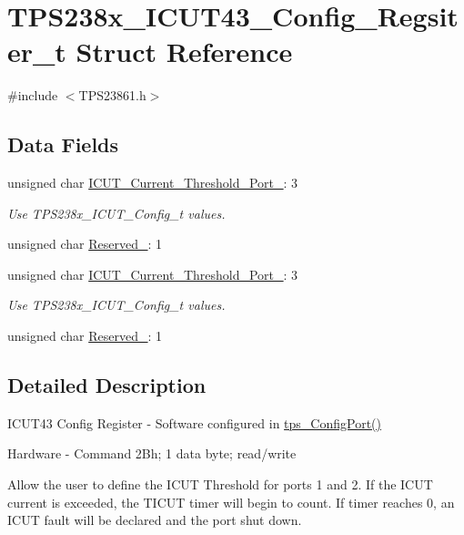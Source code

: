 \hypertarget{struct_t_p_s238x___i_c_u_t43___config___regsiter__t}{\section{T\-P\-S238x\-\_\-\-I\-C\-U\-T43\-\_\-\-Config\-\_\-\-Regsiter\-\_\-t Struct Reference}
\label{struct_t_p_s238x___i_c_u_t43___config___regsiter__t}
}


{\ttfamily \#include $<$T\-P\-S23861.\-h$>$}

\subsection*{Data Fields}
\begin{DoxyCompactItemize}
\item 
unsigned char \hyperlink{struct_t_p_s238x___i_c_u_t43___config___regsiter__t_a672725ddbaddd20636f4d1a3e1d3031c}{I\-C\-U\-T\-\_\-\-Current\-\_\-\-Threshold\-\_\-\-Port\-\_}\-: 3
\begin{DoxyCompactList}\small\item\em Use T\-P\-S238x\-\_\-\-I\-C\-U\-T\-\_\-\-Config\-\_\-t values. \end{DoxyCompactList}\item 
unsigned char \hyperlink{struct_t_p_s238x___i_c_u_t43___config___regsiter__t_a26925269078b96cfc7e9c91fcecaf905}{Reserved\-\_}\-: 1
\item 
unsigned char \hyperlink{struct_t_p_s238x___i_c_u_t43___config___regsiter__t_a3112afa8878fd6cc891279d37b6038af}{I\-C\-U\-T\-\_\-\-Current\-\_\-\-Threshold\-\_\-\-Port\-\_}\-: 3
\begin{DoxyCompactList}\small\item\em Use T\-P\-S238x\-\_\-\-I\-C\-U\-T\-\_\-\-Config\-\_\-t values. \end{DoxyCompactList}\item 
unsigned char \hyperlink{struct_t_p_s238x___i_c_u_t43___config___regsiter__t_a45c08501c716490c794d6f3a2cfc2d16}{Reserved\-\_}\-: 1
\end{DoxyCompactItemize}


\subsection{Detailed Description}
I\-C\-U\-T43 Config Register -\/ Software configured in \hyperlink{_t_p_s23861_8c_a2b787818ef7e374af218c952d3ca8a08}{tps\-\_\-\-Config\-Port()} \par
 Hardware -\/ Command 2\-Bh; 1 data byte; read/write \par
\par
 Allow the user to define the I\-C\-U\-T Threshold for ports 1 and 2. If the I\-C\-U\-T current is exceeded, the T\-I\-C\-U\-T timer will begin to count. If timer reaches 0, an I\-C\-U\-T fault will be declared and the port shut down. 

